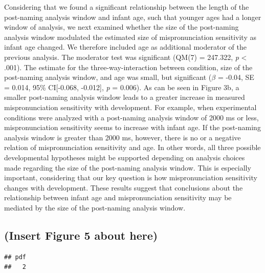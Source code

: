 \documentclass[man]{apa6}
\theoremstyle{definition}
\theoremstyle{definition}
\theoremstyle{definition}
\theoremstyle{remark}
\begin{document}
Considering that we found a significant relationship between the length
of the post-naming analysis window and infant age, such that younger
ages had a longer window of analysis, we next examined whether the size
of the post-naming analysis window modulated the estimated size of
mispronunciation sensitivity as infant age changed. We therefore
included age as additional moderator of the previous analysis. The
moderator test was significant (QM(7) = 247.322, \emph{p} \textless{}
.001). The estimate for the three-way-interaction between condition,
size of the post-naming analysis window, and age was small, but
significant (\(\beta\) = -0.04, SE = 0.014, 95\% CI{[}-0.068, -0.012{]},
\emph{p} = 0.006). As can be seen in Figure 3b, a smaller post-naming
analysis window leads to a greater increase in measured mispronunciation
sensitivity with development. For example, when experimental conditions
were analyzed with a post-naming analysis window of 2000 ms or less,
mispronunciation sensitivity seems to increase with infant age. If the
post-naming analysis window is greater than 2000 ms, however, there is
no or a negative relation of mispronunciation sensitivity and age. In
other words, all three possible developmental hypotheses might be
supported depending on analysis choices made regarding the size of the
post-naming analysis window. This is especially important, considering
that our key question is how mispronunciation sensitivity changes with
development. These results suggest that conclusions about the
relationship between infant age and mispronunciation sensitivity may be
mediated by the size of the post-naming analysis window.

\subsection{(Insert Figure 5 about
here)}\label{insert-figure-5-about-here}

\begin{verbatim}
## pdf 
##   2
\end{verbatim}
\end{document}
